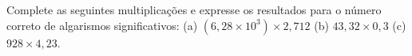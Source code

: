 Complete as seguintes multiplicações e expresse os resultados para o número correto de algarismos significativos: (a) $(6,28 \times 10^3) \times 2,712$ (b) $43,32 \times 0,3$ (c) $928 \times 4,23$.

